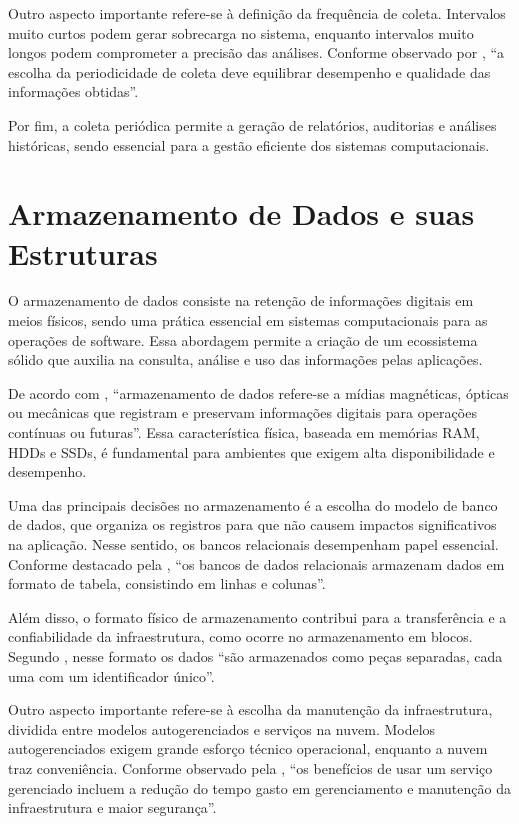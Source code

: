 \documentclass[
    12pt
    ,oneside
    ,a4paper
    ,chapter=TITLE
    ,section=TITLE
    ,sumario=abnt-6027-2012]{abntex2}
\begin{document}
Outro aspecto importante refere-se à definição da frequência de coleta. Intervalos muito curtos podem gerar sobrecarga no sistema, enquanto intervalos muito longos podem comprometer a precisão das análises. Conforme observado por , “a escolha da periodicidade de coleta deve equilibrar desempenho e qualidade das informações obtidas”.

Por fim, a coleta periódica permite a geração de relatórios, auditorias e análises históricas, sendo essencial para a gestão eficiente dos sistemas computacionais.

\section{Armazenamento de Dados e suas Estruturas}

O armazenamento de dados consiste na retenção de informações digitais em meios físicos, sendo uma prática essencial em sistemas computacionais para as operações de software. Essa abordagem permite a criação de um ecossistema sólido que auxilia na consulta, análise e uso das informações pelas aplicações.

De acordo com , “armazenamento de dados refere-se a mídias magnéticas, ópticas ou mecânicas que registram e preservam informações digitais para operações contínuas ou futuras”. Essa característica física, baseada em memórias RAM, HDDs e SSDs, é fundamental para ambientes que exigem alta disponibilidade e desempenho.

Uma das principais decisões no armazenamento é a escolha do modelo de banco de dados, que organiza os registros para que não causem impactos significativos na aplicação. Nesse sentido, os bancos relacionais desempenham papel essencial. Conforme destacado pela , “os bancos de dados relacionais armazenam dados em formato de tabela, consistindo em linhas e colunas”.

Além disso, o formato físico de armazenamento contribui para a transferência e a confiabilidade da infraestrutura, como ocorre no armazenamento em blocos. Segundo , nesse formato os dados “são armazenados como peças separadas, cada uma com um identificador único”.

Outro aspecto importante refere-se à escolha da manutenção da infraestrutura, dividida entre modelos autogerenciados e serviços na nuvem. Modelos autogerenciados exigem grande esforço técnico operacional, enquanto a nuvem traz conveniência. Conforme observado pela , “os benefícios de usar um serviço gerenciado incluem a redução do tempo gasto em gerenciamento e manutenção da infraestrutura e maior segurança”.
\end{document}
